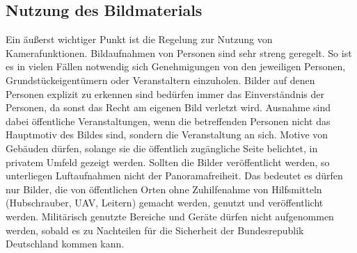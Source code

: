 \subsection{Nutzung des Bildmaterials}
Ein äußerst wichtiger Punkt ist die Regelung zur Nutzung von Kamerafunktionen. Bildaufnahmen von Personen sind sehr streng geregelt. So ist es in vielen Fällen notwendig sich Genehmigungen von den jeweiligen Personen, Grundstückeigentümern oder Veranstaltern einzuholen. Bilder auf denen Personen explizit zu erkennen sind bedürfen immer das Einverständnis der Personen, da sonst das Recht am eigenen Bild verletzt wird. Ausnahme sind dabei öffentliche Veranstaltungen, wenn die betreffenden Personen nicht das Hauptmotiv des Bildes sind, sondern die Veranstaltung an sich. Motive von Gebäuden dürfen, solange sie die öffentlich zugängliche Seite belichtet, in privatem Umfeld gezeigt werden. Sollten die Bilder veröffentlicht werden, so unterliegen Luftaufnahmen nicht der Panoramafreiheit\cite{Panoramafreiheit}. Das bedeutet es dürfen nur Bilder, die von öffentlichen Orten ohne Zuhilfenahme von Hilfsmitteln (Hubschrauber, \ac{UAV}, Leitern) gemacht werden, genutzt und veröffentlicht werden. Militärisch genutzte Bereiche und Geräte dürfen nicht aufgenommen werden, sobald es zu Nachteilen für die Sicherheit der Bundesrepublik Deutschland kommen kann.
